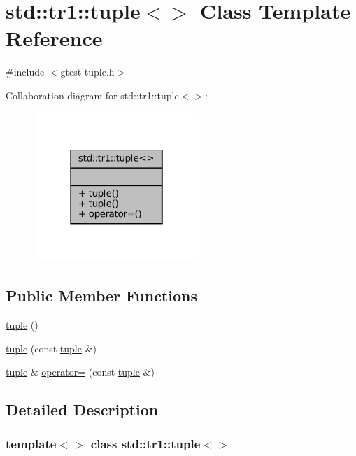 \hypertarget{classstd_1_1tr1_1_1tuple_3_4}{}\section{std\+:\+:tr1\+:\+:tuple$<$$>$ Class Template Reference}
\label{classstd_1_1tr1_1_1tuple_3_4}


{\ttfamily \#include $<$gtest-\/tuple.\+h$>$}



Collaboration diagram for std\+:\+:tr1\+:\+:tuple$<$$>$\+:
\nopagebreak
\begin{figure}[H]
\begin{center}
\leavevmode
\includegraphics[width=178pt]{classstd_1_1tr1_1_1tuple_3_4__coll__graph}
\end{center}
\end{figure}
\subsection*{Public Member Functions}
\begin{DoxyCompactItemize}
\item 
\hyperlink{classstd_1_1tr1_1_1tuple_3_4_adcea1a41d0521157971339d279aad469}{tuple} ()
\item 
\hyperlink{classstd_1_1tr1_1_1tuple_3_4_aa857599acb126134e29dc5e53fd9d1a7}{tuple} (const \hyperlink{classstd_1_1tr1_1_1tuple}{tuple} \&)
\item 
\hyperlink{classstd_1_1tr1_1_1tuple}{tuple} \& \hyperlink{classstd_1_1tr1_1_1tuple_3_4_a93ddab6f662662fc49635608619150c8}{operator=} (const \hyperlink{classstd_1_1tr1_1_1tuple}{tuple} \&)
\end{DoxyCompactItemize}


\subsection{Detailed Description}
\subsubsection*{template$<$$>$\newline
class std\+::tr1\+::tuple$<$$>$}



